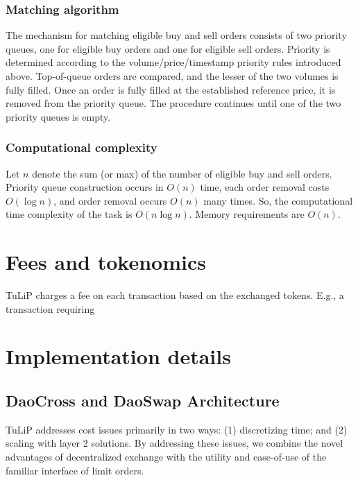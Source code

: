 \documentclass[11pt, reqno]{amsart}
\theoremstyle{definition}
\theoremstyle{remark}
\begin{document}
\subsubsection{Matching algorithm}
The mechanism for matching eligible buy and sell orders consists of two
priority queues, one for eligible buy orders and one for eligible sell orders.
Priority is determined according to the volume/price/timestamp priority rules
introduced above. Top-of-queue orders are compared, and the lesser of the two
volumes is fully filled. Once an order is fully filled at the established
reference price, it is removed from the priority queue. The procedure continues
until one of the two priority queues is empty.

\subsubsection{Computational complexity}
Let $n$ denote the sum (or max) of the number of eligible buy and sell orders.
Priority queue construction occurs in $O(n)$ time, each order removal costs
$O(\log n)$, and order removal occurs $O(n)$ many times. So, the computational
time complexity of the task is $O(n \log n)$. Memory requirements are $O(n)$.


\section{Fees and tokenomics}
TuLiP charges a fee on each transaction based on the exchanged tokens.
E.g., a transaction requiring

\section{Implementation details}

\subsection{DaoCross and DaoSwap Architecture}
TuLiP addresses cost issues primarily in two ways: (1) discretizing time; and
(2) scaling with layer 2 solutions. By addressing these issues, we combine the
novel advantages of decentralized exchange with the utility and ease-of-use of
the familiar interface of limit orders.
\end{document}
